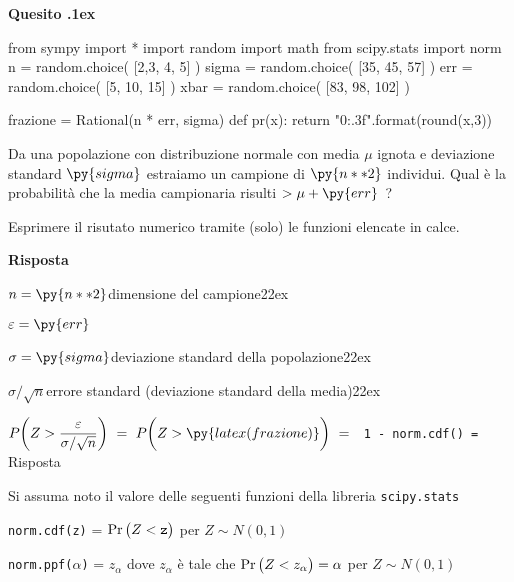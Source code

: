 \documentclass[11pt,twoside,a4paper]{article}
\def\Pr{{\rm Pr\,}}
\newcounter{quesito}
\newenvironment{question}{\addtocounter{quesito}{1}\bigskip\bigskip\par\textbf{Quesito \thequesito.\kern1ex}}{\vspace{\parskip}}
\newenvironment{answer}{\par\textbf{Risposta\quad}}{\vspace{\parskip}}
\begin{document}
\clearpage
\begin{question} 
\begin{pycode}
from sympy import *
import random
import math
from scipy.stats import norm
n = random.choice( [2,3, 4, 5] )
sigma = random.choice( [35, 45, 57] )
err = random.choice( [5, 10, 15] )
xbar = random.choice( [83, 98, 102] )

frazione =  Rational(n * err, sigma)
def pr(x):
    return "{0:.3f}".format(round(x,3))

\end{pycode}
Da una popolazione con distribuzione normale con media $\mu$ ignota e deviazione standard $\py{sigma}$ estraiamo un campione di $\py{n**2}$ individui. Qual è la probabilità che la media campionaria risulti $>\mu+ \py{err}$~? 
    
Esprimere il risutato numerico tramite (solo) le funzioni elencate in calce.

\begin{answer}
  
  $n = \py{n**2}$\hfill dimensione del campione\kern22ex
  
  $\varepsilon = \py{err}$ 
  
  $\sigma = \py{sigma}$\hfill deviazione standard della popolazione\kern22ex
  
  $\sigma/\sqrt{n}$\hfill errore standard (deviazione standard della media)\kern22ex
  
  $\displaystyle P\bigg(Z>\dfrac {\varepsilon}{\sigma/\sqrt{n}}\bigg)\ =\ P\bigg(Z>\py{latex(frazione)}\bigg)\ =\ ${\color{blue}\tt\ 1 - norm.cdf()}{\tt\ =  }{\color{blue}\hfill Risposta}

\end{answer}
\end{question}


\vfill
\hrulefill

Si assuma noto il valore delle seguenti funzioni della libreria {\tt scipy.stats\/}

{\tt norm.cdf(z)} = $\Pr\big(Z<{\tt z}\big)$ per $Z\sim N(0,1)$ 

{\tt norm.ppf($\alpha$)} = $z_\alpha$ dove $z_\alpha$ è tale che $\Pr\big(Z<z_\alpha\big)=\alpha$ per $Z\sim N(0,1)$ 
\end{document}
